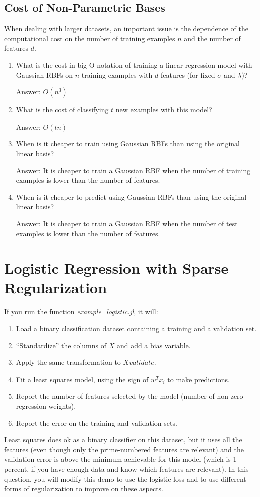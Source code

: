 \documentclass{article}
\def\ans#1{\par\gre{Answer: #1}}
\def\blu#1{{\color{blu}#1}}
\def\gre#1{{\color{gre}#1}}
\def\enum#1{\begin{enumerate}#1\end{enumerate}}
\begin{document}
\pagebreak

\subsection{Cost of Non-Parametric Bases}

When dealing with larger datasets, an important issue is the dependence of the computational cost on the number of training examples $n$ and the number of features $d$.
\blu{
\enum{
\item What is the cost in big-O notation of training a linear regression model with Gaussian RBFs on $n$ training examples with $d$ features (for fixed $\sigma$ and $\lambda$)?
\ans{$O(n^3)$}
\item What is the cost of classifying $t$ new examples with this model?
\ans{$O(tn)$}
\item When is it cheaper to train using Gaussian RBFs than using the original linear basis?
\ans{It is cheaper to train a Gaussian RBF when the number of training examples is lower than the number of features.}
\item When is it cheaper to predict using Gaussian RBFs than using the original linear basis?
\ans{It is cheaper to train a Gaussian RBF when the number of test examples is lower than the number of features.}
}}

\pagebreak

\section{Logistic Regression with Sparse Regularization}

If you run the function \emph{example\_logistic.jl}, it will:
\enum{
\item Load a binary classification dataset containing a training and a validation set.
\item ``Standardize'' the columns of $X$ and add a bias variable.
\item Apply the same transformation to $Xvalidate$.
\item Fit a least squares model, using the sign of $w^Tx_i$ to make predictions.
\item Report the number of features selected by the model (number of non-zero regression weights).
\item Report the error on the training and validation sets.
}
Least squares does ok as a binary classifier on this dataset, but it uses all the features (even though only the prime-numbered features are relevant) and the validation error is above the minimum achievable for this model (which is 1 percent, if you have enough data and know which features are relevant). In this question, you will modify this demo to use the logistic loss and to use different forms of regularization to improve on these aspects.
\end{document}
